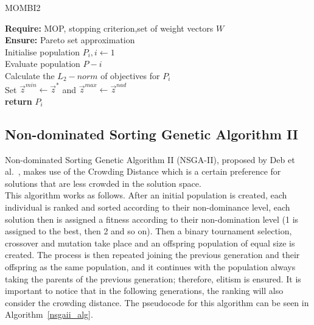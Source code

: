 \begin{algorithm}[H]
\label{mombi2_alg}
\caption{MOMBI2}
\SetAlgoLined
\textbf{Require:} MOP, stopping criterion,set of weight vectors $W$\;\\
\textbf{Ensure:} Pareto set approximation\;\\
Initialise population $P_i,i \gets 1$\;\\
Evaluate population $P-i$\;\\
Calculate the $L_2-norm$ of objectives for $P_i$\;\\
Set $\vec z^{min} \gets \vec z^*$ and $\vec z^{max} \gets \vec z^{nad}$\;\\
\textbf{return} $P_i$
\end{algorithm}


\subsection{Non-dominated Sorting Genetic Algorithm II}

Non-dominated Sorting Genetic Algorithm II (NSGA-II), proposed by Deb et al.~\cite{deb2002fast}, makes use of the Crowding Distance which is a certain preference for solutions that are less crowded in the solution space.\\

This algorithm works as follows. After an initial population is created, each individual is ranked and sorted according to their non-dominance level, each solution then is assigned a fitness according to their non-domination level (1 is assigned to the best, then 2 and so on). Then a binary tournament selection, crossover and mutation take place and an offspring population of equal size is created. The process is then repeated joining the previous generation and their offspring as the same population, and it continues with the population always taking the parents of the previous generation; therefore, elitism is ensured. It is important to notice that in the following generations, the ranking will also consider the crowding distance. The pseudocode for this algorithm can be seen in Algorithm~\ref{nsgaii_alg}.

